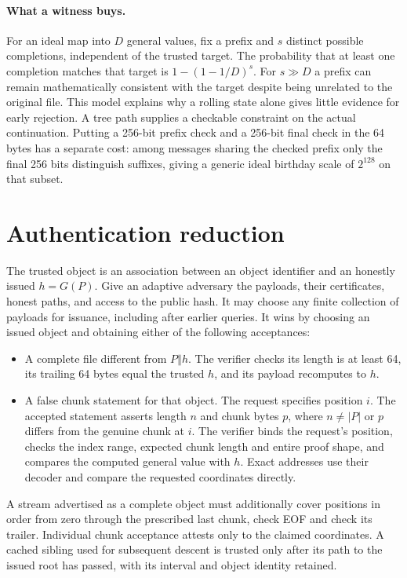 \documentclass[10pt,twocolumn,letterpaper]{article}
\newcommand{\cat}{\mathbin\Vert}
\begin{document}
\paragraph{What a witness buys.}
For an ideal map into \(D\) general values, fix a prefix and \(s\) distinct possible completions, independent of the trusted target. The probability that at least one completion matches that target is \(1-(1-1/D)^s\). For \(s\gg D\) a prefix can remain mathematically consistent with the target despite being unrelated to the original file. This model explains why a rolling state alone gives little evidence for early rejection. A tree path supplies a checkable constraint on the actual continuation. Putting a 256-bit prefix check and a 256-bit final check in the 64 bytes has a separate cost: among messages sharing the checked prefix only the final 256 bits distinguish suffixes, giving a generic ideal birthday scale of \(2^{128}\) on that subset.

\section{Authentication reduction}\label{sec:auth}
The trusted object is an association between an object identifier and an honestly issued \(h=G(P)\). Give an adaptive adversary the payloads, their certificates, honest paths, and access to the public hash. It may choose any finite collection of payloads for issuance, including after earlier queries. It wins by choosing an issued object and obtaining either of the following acceptances:
\begin{itemize}
\item A complete file different from \(P\cat h\). The verifier checks its length is at least 64, its trailing 64 bytes equal the trusted \(h\), and its payload recomputes to \(h\).
\item A false chunk statement for that object. The request specifies position \(i\). The accepted statement asserts length \(n\) and chunk bytes \(p\), where \(n\ne |P|\) or \(p\) differs from the genuine chunk at \(i\). The verifier binds the request's position, checks the index range, expected chunk length and entire proof shape, and compares the computed general value with \(h\). Exact addresses use their decoder and compare the requested coordinates directly.
\end{itemize}
A stream advertised as a complete object must additionally cover positions in order from zero through the prescribed last chunk, check EOF and check its trailer. Individual chunk acceptance attests only to the claimed coordinates. A cached sibling used for subsequent descent is trusted only after its path to the issued root has passed, with its interval and object identity retained.
\end{document}
